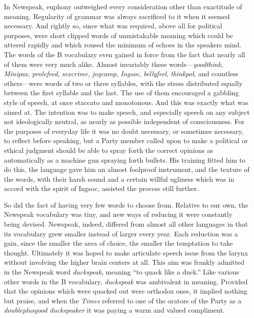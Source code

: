 In Newspeak, euphony outweighed every consideration other than
exactitude of meaning. Regularity of grammar was always sacrificed to it
when it seemed necessary. And rightly so, since what was required, above
all for political purposes, were short clipped words of unmistakable
meaning which could be uttered rapidly and which roused the minimum of
echoes in the speaker\textquotesingle s mind. The words of the B
vocabulary even gained in force from the fact that nearly all of them
were very much alike. Almost invariably these words---\emph{goodthink},
\emph{Minipax}, \emph{prolefeed}, \emph{sexcrime}, \emph{joycamp},
\emph{Ingsoc}, \emph{bellyfeel}, \emph{thinkpol}, and countless
others---were words of two or three syllables, with the stress
distributed equally between the first syllable and the last. The use of
them encouraged a gabbling style of speech, at once staccato and
monotonous. And this was exactly what was aimed at. The intention was to
make speech, and especially speech on any subject not ideologically
neutral, as nearly as possible independent of consciousness. For the
purposes of everyday life it was no doubt necessary, or sometimes
necessary, to reflect before speaking, but a Party member called upon to
make a political or ethical judgment should be able to spray forth the
correct opinions as automatically as a machine gun spraying forth
bullets. His training fitted him to do this, the language gave him an
almost foolproof instrument, and the texture of the words, with their
harsh sound and a certain willful ugliness which was in accord with the
spirit of Ingsoc, assisted the process still further.

So did the fact of having very few words to choose from. Relative to our
own, the Newspeak vocabulary was tiny, and new ways of reducing it were
constantly being devised. Newspeak, indeed, differed from almost all
other languages in that its vocabulary grew smaller instead of larger
every year. Each reduction was a gain, since the smaller the area of
choice, the smaller the temptation to take thought. Ultimately it was
hoped to make articulate speech issue from the larynx without involving
the higher brain centers at all. This aim was frankly admitted in the
Newspeak word \emph{duckspeak}, meaning ``to quack like a duck.'' Like
various other words in the B vocabulary, \emph{duckspeak} was ambivalent
in meaning. Provided that the opinions which were quacked out were
orthodox ones, it implied nothing but praise, and when the \emph{Times}
referred to one of the orators of the Party as a \emph{doubleplusgood
duckspeaker} it was paying a warm and valued compliment.


